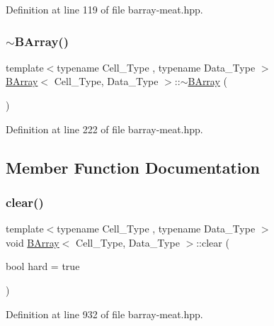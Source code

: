 Definition at line 119 of file barray-\/meat.\+hpp.

\mbox{\label{class_b_array_af39acdf29aa5999a7f5fd48141be384e}} 
\subsubsection{\texorpdfstring{$\sim$\+B\+Array()}{~BArray()}}
{\footnotesize\ttfamily template$<$typename Cell\+\_\+\+Type , typename Data\+\_\+\+Type $>$ \\
\hyperlink{class_b_array}{B\+Array}$<$ Cell\+\_\+\+Type, Data\+\_\+\+Type $>$\+::$\sim$\hyperlink{class_b_array}{B\+Array} (\begin{DoxyParamCaption}{ }\end{DoxyParamCaption})\hspace{0.3cm}{\ttfamily [inline]}}



Definition at line 222 of file barray-\/meat.\+hpp.



\subsection{Member Function Documentation}
\mbox{\label{class_b_array_a6dd5ebff333b376c6fb569e48290935f}} 
\subsubsection{\texorpdfstring{clear()}{clear()}}
{\footnotesize\ttfamily template$<$typename Cell\+\_\+\+Type , typename Data\+\_\+\+Type $>$ \\
void \hyperlink{class_b_array}{B\+Array}$<$ Cell\+\_\+\+Type, Data\+\_\+\+Type $>$\+::clear (\begin{DoxyParamCaption}\item[{bool}]{hard = {\ttfamily true} }\end{DoxyParamCaption})\hspace{0.3cm}{\ttfamily [inline]}}



Definition at line 932 of file barray-\/meat.\+hpp.

\mbox{\label{class_b_array_a4096e4447f91ba52766587a08c62f1fa}} 
